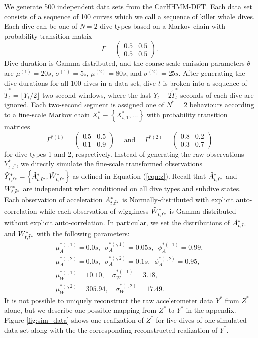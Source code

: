 We generate 500 independent data sets from the CarHHMM-DFT. Each data set consists of a sequence of 100 curves which we call a sequence of killer whale dives. Each dive can be one of $N=2$ dive types based on a Markov chain with probability transition matrix
%
$$\Gamma = \begin{pmatrix} 0.5 & 0.5 \\ 0.5 & 0.5 \end{pmatrix}.$$
%
Dive duration is Gamma distributed, and the coarse-scale emission parameters $\theta$ are $\mu^{(1)} = 20s$, $\sigma^{(1)} = 5s$, $\mu^{(2)} = 80s$, and $\sigma^{(2)} = 25s$. After generating the dive durations for all 100 dives in a data set, dive $t$ is broken into a sequence of $\tilde T^*_t = \lfloor Y_t/2 \rfloor$ two-second windows, where the last $Y_t - 2 \tilde T^*_t$ seconds of each dive are ignored. Each two-second segment is assigned one of $N^*=2$ behaviours according to a fine-scale Markov chain $X^*_t \equiv \left\{X^*_{t,1}, \ldots \right\}$ with probability transition matrices
%
$$\Gamma^{*(1)} = \begin{pmatrix} 0.5 & 0.5 \\ 0.1 & 0.9 \end{pmatrix} \quad \text{ and } \quad \Gamma^{*(2)} = \begin{pmatrix} 0.8 & 0.2 \\ 0.3 & 0.7 \end{pmatrix}$$ 
%
for dive types 1 and 2, respectively.
Instead of generating the raw observations $Y^*_{t,t^*}$, we directly simulate the fine-scale transformed observations $\tilde{Y}^*_{t,\tilde t^*} = \left\{\tilde{A}^*_{t,\tilde t^*}, \tilde{W}^*_{t,\tilde t^*}\right\}$ as defined in Equation (\ref{eqn:z}). Recall that $\tilde{A}^*_{t,\tilde t^*}$ and $\tilde{W}^*_{t,\tilde t^*}$ are independent when conditioned on all dive types and subdive states. Each observation of acceleration $\tilde{A}^*_{t,\tilde t^*}$ is Normally-distributed with explicit auto-correlation while each observation of wiggliness $\tilde{W}^*_{t,\tilde t^*}$ is Gamma-distributed without explicit auto-correlation. In particular, we set the distributions of $\tilde{A}^*_{t,\tilde t^*}$ and $\tilde{W}^*_{t,\tilde t^*}$ with the following parameters:
%
\begin{gather*}
    \mu_A^{*(\cdot,1)} = 0.0 s, \enspace \sigma_A^{*(\cdot,1)} = 0.05s, \enspace \phi_A^{*(\cdot,1)} = 0.99, \\
    \mu_A^{*(\cdot,2)} = 0.0 s, \enspace \sigma_A^{*(\cdot,2)} = 0.1s, \enspace \phi_A^{*(\cdot,2)} = 0.95, \\
    \mu_W^{*(\cdot,1)} = 10.10, \quad \sigma_W^{*(\cdot,1)} = 3.18, \\
    \mu_W^{*(\cdot,2)} = 305.94, \quad \sigma_W^{*(\cdot,2)} = 17.49.
\end{gather*}
%
It is not possible to uniquely reconstruct the raw accelerometer data $Y^*$ from $Z^*$ alone, but we describe one possible mapping from $Z^*$ to $Y^*$ in the appendix. Figure \ref{fig:sim_data} shows one realization of $Z^*$ for five dives of one simulated data set along with the the corresponding reconstructed realization of $Y^*$. 

